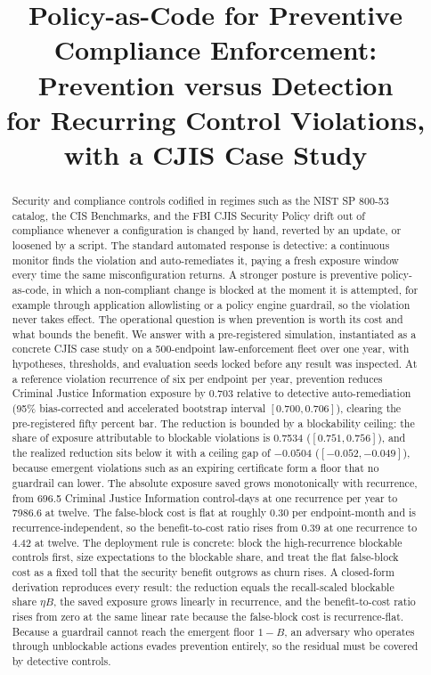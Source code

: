 \documentclass[journal]{IEEEtran}
\title{Policy-as-Code for Preventive Compliance Enforcement: Prevention versus Detection\\
for Recurring Control Violations, with a CJIS Case Study}
\author{%
  \IEEEauthorblockN{Harshavardhan Malla}
  \IEEEauthorblockA{Independent Researcher\\
  Email: harshavardhanmalla75@gmail.com}%
}
\begin{document}
\maketitle

\begin{abstract}
Security and compliance controls codified in regimes such as the NIST SP 800-53 catalog, the CIS
Benchmarks, and the FBI CJIS Security Policy drift out of compliance whenever a configuration is
changed by hand, reverted by an update, or loosened by a script. The standard automated response is
detective: a continuous monitor finds the violation and auto-remediates it, paying a fresh exposure
window every time the same misconfiguration returns. A stronger posture is preventive
policy-as-code, in which a non-compliant change is blocked at the moment it is attempted, for
example through application allowlisting or a policy engine guardrail, so the violation never takes
effect. The operational question is when prevention is worth its cost and what bounds the benefit.
We answer with a pre-registered simulation, instantiated as a concrete CJIS case study on a
500-endpoint law-enforcement fleet over one year, with hypotheses, thresholds, and
evaluation seeds locked before any result was inspected. At a reference violation recurrence of six
per endpoint per year, prevention reduces Criminal Justice Information exposure by 0.703 relative to
detective auto-remediation (95\% bias-corrected and accelerated bootstrap interval $[0.700, 0.706]$),
clearing the pre-registered fifty percent bar. The reduction is bounded by a blockability ceiling:
the share of exposure attributable to blockable violations is 0.7534 ($[0.751, 0.756]$), and the
realized reduction sits below it with a ceiling gap of $-0.0504$ ($[-0.052, -0.049]$), because
emergent violations such as an expiring certificate form a floor that no guardrail can lower. The
absolute exposure saved grows monotonically with recurrence, from 696.5 Criminal Justice
Information control-days at one recurrence per year to 7986.6 at twelve. The false-block cost is
flat at roughly 0.30 per endpoint-month and is recurrence-independent, so the benefit-to-cost ratio
rises from 0.39 at one recurrence to 4.42 at twelve. The deployment rule is concrete: block the
high-recurrence blockable controls first, size expectations to the blockable share, and treat the
flat false-block cost as a fixed toll that the security benefit outgrows as churn rises. A
closed-form derivation reproduces every result: the reduction equals the recall-scaled blockable
share $\eta B$, the saved exposure grows linearly in recurrence, and the benefit-to-cost ratio
rises from zero at the same linear rate because the false-block cost is recurrence-flat. Because a
guardrail cannot reach the emergent floor $1 - B$, an adversary who operates through unblockable
actions evades prevention entirely, so the residual must be covered by detective controls.
\end{abstract}
\end{document}
